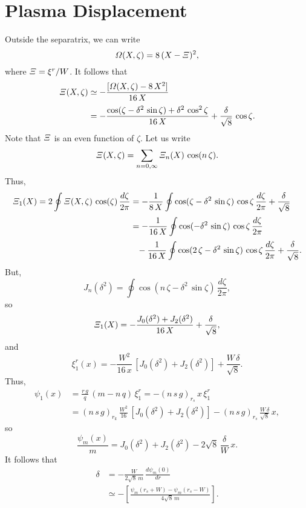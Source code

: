 \documentclass[12pt,prb,aps,notitlepage]{revtex4-1}
\begin{document}
\section{Plasma Displacement}
Outside the separatrix, we can write
\begin{equation}
{\mit\Omega}(X,\zeta) = 8\,(X-{\mit\Xi})^2,
\end{equation}
where ${\mit\Xi}= \xi^r/W$. It follows that
\begin{align}
{\mit\Xi}(X,\zeta)&\simeq -\frac{[{\mit\Omega}(X,\zeta)-8\,X^2]}{16\,X}\nonumber\\[0.5ex]
&=- \frac{\cos(\zeta-\delta^2\,\sin\zeta) +\delta^2\,\cos^2\zeta}{16\,X}+\frac{\delta}{\sqrt{8}}\,\cos\zeta.
\end{align}
Note that ${\mit\Xi}$ is an even function of $\zeta$. 
Let us write
\begin{equation}
{\mit\Xi}(X,\zeta)= \sum_{n=0,\infty} {\mit\Xi}_n(X)\,\cos(n\,\zeta).
\end{equation}
Thus,
\begin{align}
{\mit\Xi}_1(X) =2 \oint {\mit\Xi}(X,\zeta)\,\cos(\zeta)\,\frac{d\zeta}{2\pi} &= -\frac{1}{8\,X}\oint\cos(\zeta-\delta^2\,\sin\zeta)\,\cos\zeta\,\frac{d\zeta}{2\pi}+\frac{\delta}{\sqrt{8}} \\[0.5ex]
&=-\frac{1}{16\,X}\oint\cos(-\delta^2\,\sin\zeta)\,\cos\zeta\,\frac{d\zeta}{2\pi}\nonumber\\[0.5ex]
&\phantom{=}- \frac{1}{16\,X}\oint\cos(2\,\zeta-\delta^2\,\sin\zeta)\,\cos\zeta\,\frac{d\zeta}{2\pi}+\frac{\delta}{\sqrt{8}} .
\end{align}
But,
\begin{equation}
J_n(\delta^2) = \oint\cos(n\,\zeta-\delta^2\,\sin\zeta)\,\frac{d\zeta}{2\pi},
\end{equation}
so
\begin{equation}
{\mit\Xi}_1(X) =- \frac{J_0(\delta^2) + J_2(\delta^2)}{16\,X}+ \frac{\delta}{\sqrt{8}} ,
\end{equation}
and
\begin{equation}
\xi^r_1(x) =- \frac{W^2}{16\,x}\,[J_0(\delta^2)+ J_2(\delta^2)]+ \frac{W\,\delta}{\sqrt{8}} .
\end{equation}
Thus,
\begin{align}
\psi_1(x) &= \frac{r\,g}{q}\,(m-n\,q)\,\xi_1^r = -(n\,s\,g)_{r_s}\,x\,\xi_1^r\nonumber\\[0.5ex]
&= (n\,s\,g)_{r_k}\,\frac{W^2}{16}\,[J_0(\delta^2)+ J_2(\delta^2)] - (n\,s\,g)_{r_s}\,\frac{W\,\delta}{\sqrt{8}}\,x,
\end{align}
so
\begin{equation}
\frac{\psi_m(x)}{m} = J_0(\delta^2)+ J_2(\delta^2) - 2\sqrt{8}\,\frac{\delta}{W}\,x.
\end{equation}
It follows that
\begin{align}
\delta &= -\frac{W}{2\sqrt{8}\,m}\,\frac{d\psi_m(0)}{dr}\\[0.5ex]
&\simeq -\left[\frac{\psi_m(r_s+W)-\psi_m(r_s-W)}{4\sqrt{8}\,m}\right].
\end{align}
\end{document}
